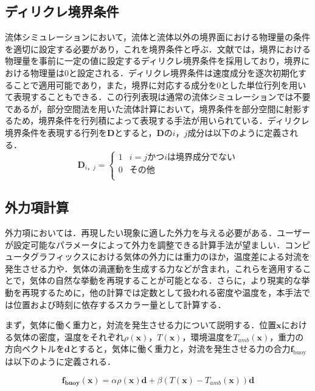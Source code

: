 \documentclass[a4j,12pt]{jreport}
\begin{document}
\subsection{ディリクレ境界条件}
流体シミュレーションにおいて，流体と流体以外の境界面における物理量の条件を適切に設定する必要があり，これを境界条件と呼ぶ．文献\cite{fedkiw}では，境界における物理量を事前に一定の値に設定するディリクレ境界条件を採用しており，境界における物理量は$0$と設定される．ディリクレ境界条件は速度成分を逐次初期化することで適用可能であり，また，境界に対応する成分を$0$とした単位行列を用いて表現することもできる．この行列表現は通常の流体シミュレーションでは不要であるが，部分空間法を用いた流体計算において，境界条件を部分空間に射影するため，境界条件を行列積によって表現する手法が用いられている．ディリクレ境界条件を表現する行列を$\bm{D}$とすると，$\bm{D}$の$i，j$成分は以下のように定義される．
\begin{equation}
	\bm{D}_{i，j} = \begin{cases}
 	1 	& i = j かつ iは境界成分でない\\
 	0  		& その他\\
 \end{cases}
\end{equation}


\subsection{外力項計算}
外力項においては．再現したい現象に適した外力を与える必要がある．ユーザーが設定可能なパラメータによって外力を調整できる計算手法が望ましい．コンピュータグラフィックスにおける気体の外力には重力のほか，温度差による対流を発生させる力や．気体の渦運動を生成する力などが含まれ，これらを適用することで，気体の自然な挙動を再現することが可能となる．さらに，より現実的な挙動を再現するために，他の計算では定数として扱われる密度や温度を，本手法では位置および時刻に依存するスカラー量として計算する．

まず，気体に働く重力と，対流を発生させる力について説明する．位置$\bm{x}$における気体の密度，温度をそれぞれ$\rho(\bm{x})$，$T(\bm{x})$，環境温度を$T_{amb}(\bm{x})$，重力の方向ベクトルを$\bm{d}$とすると，気体に働く重力と，対流を発生させる力の合力$\bm{f}_{\text{buoy}}$は以下のように定義される．

\begin{equation}\label{eq:buoyancy}
	\bm{f_{\text{buoy}}(\bm{x})} =  \alpha \rho(\bm{x})\bm{d}+ \beta(T(\bm{x})- T_{amb}(\bm{x}))\bm{d}
\end{equation} 
\end{document}
